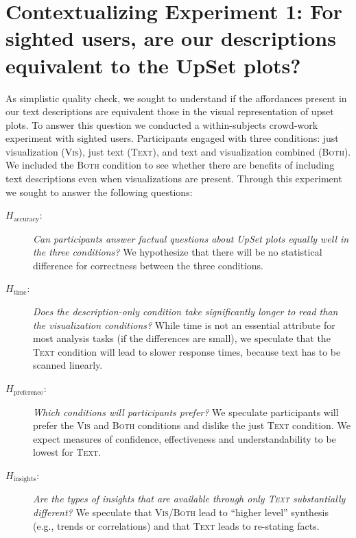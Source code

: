 \documentclass{egpubl}
\newcommand{\eg}{{e.g.,}}
\newcommand{\condition}[1]{\textsc{#1}}
\newcommand{\condVis}{\condition{Vis}}
\newcommand{\condText}{\condition{Text}}
\newcommand{\condBoth}{\condition{Both}}
\begin{document}
\section{Contextualizing Experiment 1: For sighted users, are our descriptions equivalent to the UpSet plots? }
\label{sec:survey}




As simplistic quality check, we sought to understand if the affordances present in our text descriptions are equivalent those in the visual representation of upset plots.
To answer this question we conducted a within-subjects crowd-work experiment with sighted users. Participants engaged with three conditions: just visualization (\condVis{}), just text (\condText{}), and text and visualization combined (\condBoth{}).
We included the \condBoth{} condition to see whether there are benefits of including text descriptions even when visualizations are present.
Through this experiment we sought to answer the following questions:


\newcommand{\hypo}[1]{$H_{\text{#1}}$}
\newcommand{\hAcc}{\hypo{accuracy}}
\newcommand{\hPref}{\hypo{preference}}
\newcommand{\hTime}{\hypo{time}}
\newcommand{\hVibes}{\hypo{insights}}


\begin{description}
    \item[\hAcc{}:]
          \emph{Can participants answer factual questions about UpSet plots equally well in the three conditions?}
          We hypothesize that there will be no statistical difference for correctness between the three conditions.

    \item[\hTime{}:]
          \emph{Does the description-only condition take significantly longer to read than the visualization conditions?}
          While time is not an essential attribute for most analysis tasks (if the differences are small), we speculate that the \condText{} condition will lead to slower response times, because text has to be scanned linearly.

    \item[\hPref{}:]
          \emph{Which conditions will participants prefer?}
          We speculate participants will prefer the \condVis{} and \condBoth{} conditions and dislike the just \condText{} condition. We expect measures of confidence, effectiveness and understandability to be lowest for \condText{}.


    \item[\hVibes{}:]
          \emph{Are the types of insights that are available through only \condText{} substantially different?}
          We speculate that \condVis{}/\condBoth{} lead to ``higher level'' synthesis (\eg{}  trends or correlations) and that \condText{} leads to re-stating facts.
\end{description}
\end{document}
